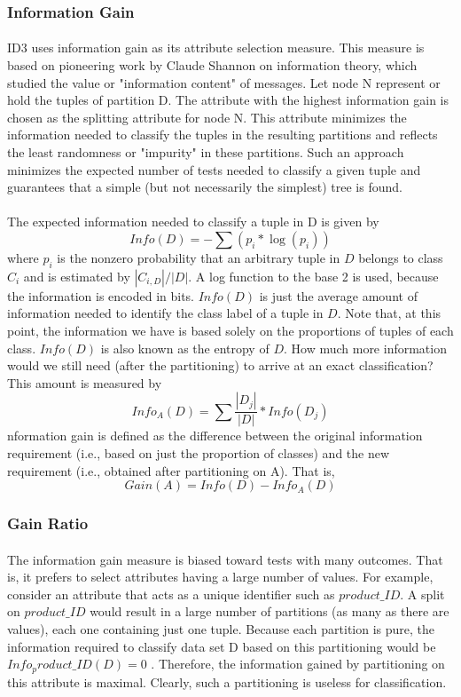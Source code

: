 \subsubsection{Information Gain}\label{infogain}
\paragraph{}
ID3 uses information gain as its attribute selection measure. This measure is based on pioneering work by
Claude Shannon on information theory, which studied the value or "information content" of messages. Let
node N represent or hold the tuples of partition D. The attribute with the highest information gain is chosen as
the splitting attribute for node N. This attribute minimizes the information needed to classify the tuples in the
resulting partitions and reflects the least randomness or "impurity" in these partitions. Such an approach
minimizes the expected number of tests needed to classify a given tuple and guarantees that a simple (but not
necessarily the simplest) tree is found.
\paragraph{}
The expected information needed to classify a tuple in D is given by $$ Info(D)= -\sum(p_i*\log(p_i)) $$
where $p_i$ is the nonzero probability that an arbitrary tuple in $D$ belongs to class $C_i$ and is estimated by $|C_{i,D}|/|D|$. A log function to the base 2 is used, because the information is encoded in bits. $Info(D)$ is just the average amount of information needed to identify the class label of a tuple in $D$. Note that, at this point, the
information we have is based solely on the proportions of tuples of each class. $Info(D)$ is also known as the
entropy of $D$.
How much more information would we still need (after the partitioning) to arrive at an exact classification?
This amount is measured by $$Info_A(D)=\sum{\dfrac{|D_j|}{|D|}*Info(D_j)} $$
nformation gain is defined as the difference between the original information requirement (i.e., based on just
the proportion of classes) and the new requirement (i.e., obtained after partitioning on A). That is,
$$Gain(A)=Info(D)-Info_A(D)$$

\subsubsection{Gain Ratio}
\paragraph{}
The information gain measure is biased toward tests with many outcomes. That is, it prefers to select attributes
having a large number of values. For example, consider an attribute that acts as a unique identifier such as
$product\_ID$. A split on $product\_ID$ would result in a large number of partitions (as many as there are values),
each one containing just one tuple. Because each partition is pure, the information required to classify data set
D based on this partitioning would be $Info_product\_ID(D)=0$ . Therefore, the information gained by partitioning on this attribute is maximal. Clearly, such a partitioning is useless for classification.
